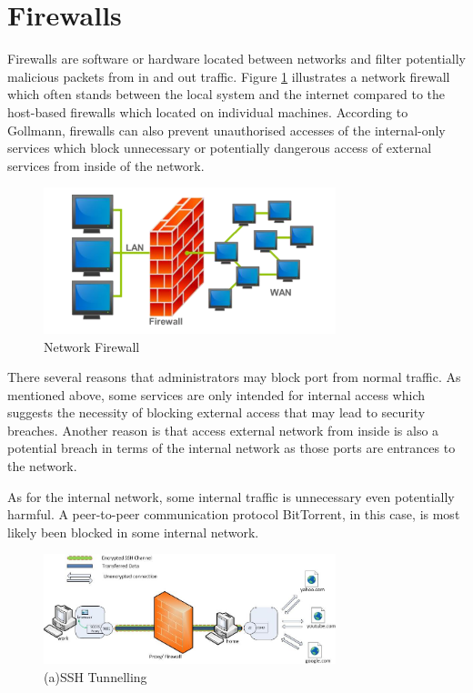 \documentclass{article}
\begin{document}
\section{Firewalls}
\label{sec:firewalls}

Firewalls are software or hardware located between networks and filter potentially malicious 
packets from in and out traffic\cite{AndersonRoss1956-2008Se:a}.
Figure \ref{firewall} illustrates a network firewall which often stands between the local system and 
the internet compared to the host-based firewalls which located on individual machines. 
According to Gollmann, firewalls can also prevent unauthorised accesses of the internal-only services which 
block unnecessary or potentially dangerous access of external services from inside of the network\cite{GollmannDieter2011Cs/D}.

\begin{figure}[H]
  \includegraphics[width=8.5cm]{firewall}
  \caption{Network Firewall}
  \label{firewall}
\end{figure}

There several reasons that administrators may block port from normal traffic. As mentioned above, some services 
are only intended for internal access which suggests the necessity of blocking external access that 
may lead to security breaches. Another reason is that access external network from inside is also a potential 
breach in terms of the internal network as those ports are entrances to the network. 

As for the internal network, some internal traffic is unnecessary even potentially harmful. A peer-to-peer 
communication protocol BitTorrent, in this case, is most likely been blocked in some internal network.

\begin{figure}[H]
  \includegraphics[width=8.5cm]{ssh}
  \caption{(a)SSH Tunnelling\cite{chamith_2012}}
  \label{ssh}
\end{figure}
\end{document}
